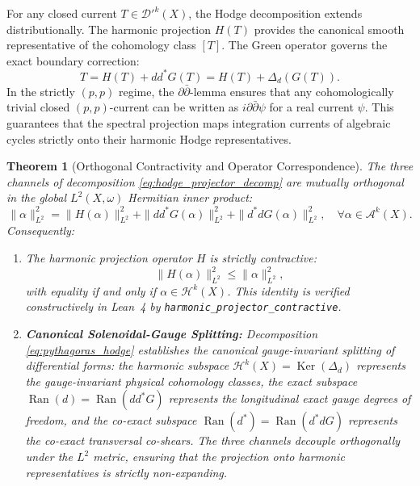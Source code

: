 \documentclass[11pt,a4paper]{article}
\theoremstyle{definition}
\theoremstyle{plain}
\newtheorem{theorem}[definition]{Theorem}
\DeclareMathOperator{\Ker}{Ker}
\DeclareMathOperator{\Ran}{Ran}
\begin{document}
For any closed current $T \in \mathcal{D}'^k(X)$, the Hodge decomposition extends distributionally. The harmonic projection $H(T)$ provides the canonical smooth representative of the cohomology class $[T]$. The Green operator governs the exact boundary correction:
\begin{equation}
    \label{eq:green_boundary_correction}
    T = H(T) + d d^* G(T) = H(T) + \Delta_d \left( G(T) \right).
\end{equation}
In the strictly $(p,p)$ regime, the $\partial \bar{\partial}$-lemma ensures that any cohomologically trivial closed $(p,p)$-current can be written as $i \partial \bar{\partial} \psi$ for a real current $\psi$. This guarantees that the spectral projection maps integration currents of algebraic cycles strictly onto their harmonic Hodge representatives.

\begin{theorem}[Orthogonal Contractivity and Operator Correspondence]
\label{thm:harmonic_projector_contractive}
The three channels of decomposition \eqref{eq:hodge_projector_decomp} are mutually orthogonal in the global $L^2(X, \omega)$ Hermitian inner product:
\begin{equation}
    \label{eq:pythagoras_hodge}
    \|\alpha\|_{L^2}^2 = \|H(\alpha)\|_{L^2}^2 + \|d d^* G(\alpha)\|_{L^2}^2 + \|d^* d G(\alpha)\|_{L^2}^2, \quad \forall \alpha \in \mathcal{A}^k(X).
\end{equation}
Consequently:
\begin{enumerate}[label=(\roman*)]
    \item The harmonic projection operator $H$ is strictly contractive:
    \begin{equation}
        \label{eq:hodge_contractivity_bound}
        \|H(\alpha)\|_{L^2}^2 \le \|\alpha\|_{L^2}^2,
    \end{equation}
    with equality if and only if $\alpha \in \mathcal{H}^k(X)$. This identity is verified constructively in Lean~4 by \texttt{harmonic\_projector\_contractive}.
    \item \textbf{Canonical Solenoidal-Gauge Splitting:} Decomposition \eqref{eq:pythagoras_hodge} establishes the canonical gauge-invariant splitting of differential forms: the harmonic subspace $\mathcal{H}^k(X) = \Ker(\Delta_d)$ represents the gauge-invariant physical cohomology classes, the exact subspace $\Ran(d) = \Ran(d d^* G)$ represents the longitudinal exact gauge degrees of freedom, and the co-exact subspace $\Ran(d^*) = \Ran(d^* d G)$ represents the co-exact transversal co-shears. The three channels decouple orthogonally under the $L^2$ metric, ensuring that the projection onto harmonic representatives is strictly non-expanding.
\end{enumerate}
\end{theorem}
\end{document}
